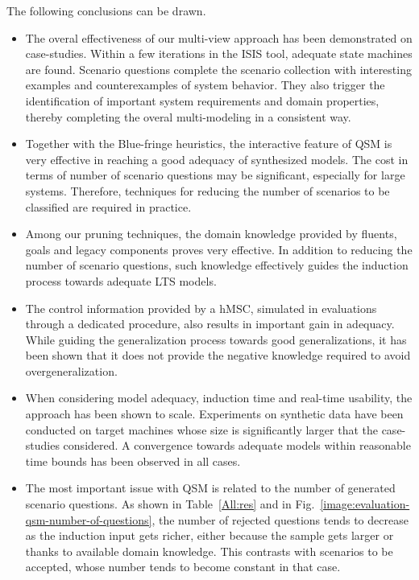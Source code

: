 The following conclusions can be drawn.
\begin{itemize}

\item The overal effectiveness of our multi-view approach has been demonstrated on case-studies. Within a few iterations in the ISIS tool, adequate state machines are found. Scenario questions complete the scenario collection with interesting examples and counterexamples of system behavior. They also trigger the identification of important system requirements and domain properties, thereby completing the overal multi-modeling in a consistent way.

\item Together with the Blue-fringe heuristics, the interactive feature of QSM is very effective in reaching a good adequacy of synthesized models. The cost in terms of number of scenario questions may be significant, especially for large systems. Therefore, techniques for reducing the number of scenarios to be classified are required in practice.

\item Among our pruning techniques, the domain knowledge provided by fluents, goals and legacy components proves very effective. In addition to reducing the number of scenario questions, such knowledge effectively guides the induction process towards adequate LTS models. 

\item The control information provided by a hMSC, simulated in evaluations through a dedicated procedure, also results in important gain in adequacy. While guiding the generalization process towards good generalizations, it has been shown that it does not provide the negative knowledge required to avoid overgeneralization.

\item When considering model adequacy, induction time and real-time usability, the approach has been shown to scale. Experiments on synthetic data have been conducted on target machines whose size is significantly larger that the case-studies considered. A convergence towards adequate models within reasonable time bounds has been observed in all cases.

\item The most important issue with QSM is related to the number of generated scenario questions. As shown in Table~\ref{All:res} and in Fig.~\ref{image:evaluation-qsm-number-of-questions}, the number of rejected questions tends to decrease as the induction input gets richer, either because the sample gets larger or thanks to available domain knowledge. This contrasts with scenarios to be accepted, whose number tends to become constant in that case.


\end{itemize}
